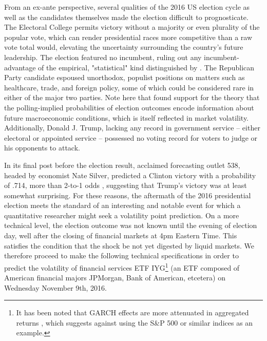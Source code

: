 \documentclass[11pt]{article}
\theoremstyle{definition}
\begin{document}
From an ex-ante perspective, several qualities of the 2016 US election cycle as well as the candidates themselves made the election difficult to prognosticate.  The Electoral College permits victory without a majority or even plurality of the popular vote, which can render presidential races more competitive than a raw vote total would, elevating the uncertainty surrounding the country's future leadership.  The election featured no incumbent, ruling out any incumbent-advantage of the empirical, "statistical" kind distinguished by \citet{mayhew2008incumbency}.  The Republican Party candidate espoused unorthodox, populist positions on matters such as healthcare, trade, and foreign policy, some of which could be considered rare in either of the major two parties.  Note here that \citet{goodell2013us} found support for the theory that the polling-implied probabilities of election outcomes encode information about future macroeconomic conditions, which is itself reflected in market volatility.  Additionally, Donald J. Trump, lacking any record in government service -- either electoral or appointed service -- possessed no voting record for voters to judge or his opponents to attack.  

In its final post before the election result, acclaimed forecasting outlet 538, headed by economist Nate Silver, predicted a Clinton victory with a probability of .714, more than 2-to-1 odds \citep{Silver_2016}, suggesting that Trump's victory was at least somewhat surprising.  For these reasons, the aftermath of the 2016 presidential election meets the standard of an interesting and notable event for which a quantitative researcher might seek a volatility point prediction.  On a more technical level, the election outcome was not known until the evening of election day, well after the closing of financial markets at 4pm Eastern Time.  This satisfies the condition that the shock be not yet digested by liquid markets.  We therefore proceed to make the following technical specifications in order to predict the volatility of financial services ETF IYG\footnote{It has been noted that GARCH effects are more attenuated in aggregated returns \citep{zivot2009practical}, which suggests against using the S\&P 500 or similar indices as an example.} (an ETF composed of American financial majors JPMorgan, Bank of American, etcetera) on Wednesday November 9th, 2016.
\end{document}
